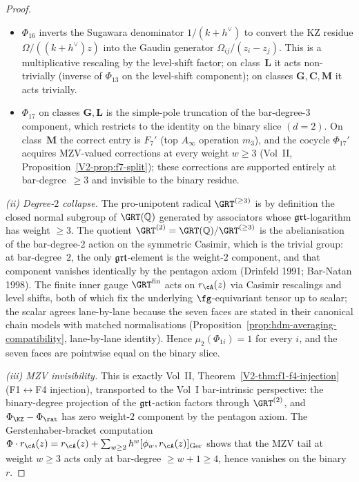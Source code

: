 \begin{proof}
\begin{itemize}
leading coefficient $P/u$ is the rational $r$-matrix; the
$O(\hbar^2)$ tail carries no MZV at weight~$2$ (because the
weight-$2$ generator of $\fgrt$ vanishes by the pentagon axiom).
Hence $\Phi_{15}$ is identity at bar-degree~$2$ modulo
$\GRT^{\mathrm{fin}}$.
\item $\Phi_{16}$ inverts the Sugawara denominator $1/(k+h^\vee)$
to convert the KZ residue $\Omega/((k+h^\vee)z)$ into the Gaudin
generator $\Omega_{ij}/(z_i-z_j)$. This is a multiplicative
rescaling by the level-shift factor; on class~$\mathbf{L}$ it acts
non-trivially (inverse of $\Phi_{13}$ on the level-shift component);
on classes $\mathbf{G},\mathbf{C},\mathbf{M}$ it acts trivially.
\item $\Phi_{17}$ on classes $\mathbf{G},\mathbf{L}$ is the
simple-pole truncation of the bar-degree-$3$ component, which
restricts to the identity on the binary slice $(d=2)$. On
class~$\mathbf{M}$ the correct entry is $F_7'$ (top $A_\infty$
operation $m_3$), and the cocycle $\Phi_{17}'$ acquires MZV-valued
corrections at every weight $w\geq 3$
(Vol~II, Proposition~\ref{V2-prop:f7-split}); these corrections are
supported entirely at bar-degree~$\geq 3$ and invisible to the
binary residue.
\end{itemize}

\smallskip\noindent
\emph{(ii) Degree-$2$ collapse.} The pro-unipotent radical
$\GRT^{(\geq 3)}$ is by definition the closed normal subgroup of
$\GRT(\mathbb{Q})$ generated by associators whose
$\fgrt$-logarithm has weight $\geq 3$. The quotient
$\GRT^{(2)}=\GRT(\mathbb{Q})/\GRT^{(\geq 3)}$ is the abelianisation
of the bar-degree-$2$ action on the symmetric Casimir, which is the
trivial group: at bar-degree~$2$, the only $\fgrt$-element is the
weight-$2$ component, and that component vanishes identically by the
pentagon axiom (Drinfeld 1991; Bar-Natan 1998). The finite inner
gauge $\GRT^{\mathrm{fin}}$ acts on $r_\cA(z)$ via Casimir
rescalings and level shifts, both of which fix the underlying
$\fg$-equivariant tensor up to scalar; the scalar agrees lane-by-lane
because the seven faces are stated in their canonical chain models
with matched normalisations
(Proposition~\ref{prop:hdm-averaging-compatibility}, lane-by-lane
identity). Hence $\mu_2(\Phi_{1i})=1$ for every $i$, and the seven
faces are pointwise equal on the binary slice.

\smallskip\noindent
\emph{(iii) MZV invisibility.} This is exactly Vol~II,
Theorem~\ref{V2-thm:f1-f4-injection} (F1$\leftrightarrow$F4 injection),
transported to the Vol~I bar-intrinsic perspective: the binary-degree
projection of the $\fgrt$-action factors through $\GRT^{(2)}$, and
$\Phi_{\KZ}-\Phi_{\rat}$ has zero weight-$2$ component by the
pentagon axiom. The Gerstenhaber-bracket computation
$\Phi\cdot r_\cA(z)
=
r_\cA(z)+\sum_{w\geq 2}\hbar^w[\phi_w,r_\cA(z)]_{\mathrm{Ger}}$
shows that the MZV tail at weight $w\geq 3$ acts only at bar-degree
$\geq w+1\geq 4$, hence vanishes on the binary $r$.


\end{proof}
